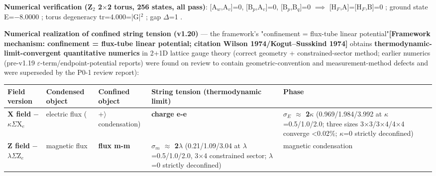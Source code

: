 \documentclass[12pt]{article}
\newcommand{\mtag}[1]{\textbf{[#1]}}
\newcommand{\up}[1]{\ensuremath{^{#1}}}
\newcommand{\down}[1]{\ensuremath{_{#1}}}
\begin{document}
\textbf{Numerical verification (Z\down{2} 2\ensuremath{\times}2 torus, 256 states, all pass)}: [A\down{w},A\down{v}]=0, [B\down{p},A\down{v}]=0, [B\down{p},B\down{q}]=0 \ensuremath{\implies} [H\down{F},A]=[H\down{F},B]=0 \checkmark; ground state E=\ensuremath{-}8.0000 \checkmark; torus degeneracy tr=4.000=|G|\up{2} \checkmark; gap \ensuremath{\Delta}=1 \checkmark.

\textbf{Numerical realization of confined string tension (v1.20)} --- the framework's "confinement = flux-tube linear potential"\mtag{Framework mechanism: confinement = flux-tube linear potential; citation Wilson 1974/Kogut--Susskind 1974} obtains \textbf{thermodynamic-limit-convergent quantitative numerics} in 2+1D lattice gauge theory (correct geometry + constrained-sector method; earlier numerics (pre-v1.19 \ensuremath{\varepsilon}-term/endpoint-potential reports) were found on review to contain geometric-convention and measurement-method defects and were superseded by the P0-1 review report):

\begin{table}[htbp]
\centering
\footnotesize
\begin{tabularx}{\textwidth}{@{}lXXXX@{}}
\toprule
Field version & Condensed object & Confined object & String tension (thermodynamic limit) & Phase \\
\midrule
\textbf{X field} \ensuremath{-}\ensuremath{\kappa}\ensuremath{\Sigma}X\down{e} & electric flux (\ & +\ensuremath{\rangle} condensation) & \textbf{charge e-e} & \textbf{\ensuremath{\sigma}\down{E} \ensuremath{\approx} 2\ensuremath{\kappa}} (0.969/1.984/3.992 at \ensuremath{\kappa}=0.5/1.0/2.0; three sizes 3\ensuremath{\times}3/3\ensuremath{\times}4/4\ensuremath{\times}4 converge <0.02\%; \ensuremath{\kappa}=0 strictly deconfined) \\
\textbf{Z field} \ensuremath{-}\ensuremath{\lambda}\ensuremath{\Sigma}Z\down{e} & magnetic flux & \textbf{flux m-m} & \textbf{\ensuremath{\sigma}\down{m} \ensuremath{\approx} 2\ensuremath{\lambda}} (0.21/1.09/3.04 at \ensuremath{\lambda}=0.5/1.0/2.0, 3\ensuremath{\times}4 constrained sector; \ensuremath{\lambda}=0 strictly deconfined) & magnetic condensation \\
\bottomrule
\end{tabularx}
\end{table}
\end{document}
